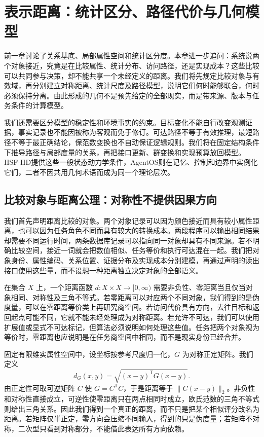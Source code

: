 \chapter{表示距离：统计区分、路径代价与几何模型}
\label{chp:riemannian_base}

前一章讨论了关系基底、局部属性空间和统计区分度。本章进一步追问：系统说两个对象接近，究竟是在比较属性、统计分布、访问路径，还是实现成本？这些比较可以共同参与决策，却不能共享一个未经定义的距离。我们将先规定比较对象与有效域，再分别建立对称距离、统计尺度及路径模型，说明它们何时能够联合，何时必须保持分离。由此形成的几何不是预先给定的全部现实，而是带来源、版本与任务条件的计算模型。

我们还需要区分模型的稳定性和环境事实的约束。目标变化不能自行改变观测证据，事实记录也不能因被称为客观而免于修订。可达路径不等于有效推理，最短路径不等于最正确结论，保范数变换也不自动保证逻辑规则。我们将在固定结构条件下推导路径与局部度量的关系，再把接口更新、群变换和实现预算放回模型。HSF-HD提供这些一般状态动力学条件，AgentOS则在记忆、控制和边界中实例化它们，二者不因共用几何术语而成为同一个理论层次。

\section{比较对象与距离公理：对称性不提供因果方向}
\label{sec:section_203}

我们首先声明距离比较的对象。两个对象记录可以因为颜色接近而具有较小属性距离，也可以因为任务角色不同而具有较大的转换成本。两段程序可以输出相同结果却需要不同运行时间，两条数据库记录可以指向同一对象却具有不同来源。若不明确比较空间，接近一词就会把数值相似、任务等价和执行可达混在一起。我们把对象身份、属性编码、关系位置、证据分布及实现成本分别建模，再通过声明的读出接口使用这些量，而不设想一种距离独立决定对象的全部语义。

在集合 $X$ 上，一个距离函数 $d:X\times X\to[0,\infty)$ 需要非负性、零距离当且仅当对象相同、对称性及三角不等式。若零距离可以对应两个不同对象，我们得到的是伪度量，可以在零距离等价类上再研究商空间。若访问代价具有方向，去往目标和返回起点可能不同，它就不能未经处理成为对称距离。若允许不可达，我们可以使用扩展值或显式不可达标记，但算法必须说明如何处理这些值。任务把两个对象视为等价时，零距离也应说明是在任务商空间中相同，而不是现实身份已经合并。

固定有限维实属性空间中，设坐标按参考尺度归一化，$G$ 为对称正定矩阵。我们定义
\[
 d_G(x,y)=\sqrt{(x-y)^{\mathsf T}G(x-y)}.
\]
由正定性可取可逆矩阵 $C$ 使 $G=C^{\mathsf T}C$，于是距离等于 $\|C(x-y)\|_2$。非负性和对称性直接成立，可逆性使零距离只在两点相同时成立，欧氏范数的三角不等式则给出三角关系。因此我们得到一个真正的距离，而不只是把某个相似评分改名为距离。若矩阵仅半正定，零方向会压缩不同输入，得到的只是伪度量；若矩阵不对称，二次型只看到对称部分，不能借此表达所有方向依赖。

